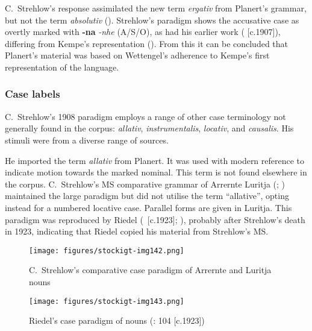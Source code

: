 C.~Strehlow’s response assimilated the new term \textit{ergativ} from Planert’s grammar, but not the term \textit{absolutiv} (). Strehlow’s paradigm shows the accusative case as overtly marked with \textbf{-na} \textit{{}-nhe} (A/S/O), as had his earlier work (\citeyear{strehlow_untitled_1931} [c.1907]), differing from Kempe’s representation (). From this it can be concluded that Planert’s material was based on Wettengel’s adherence to Kempe’s first representation of the language.

\subsubsection{Case labels}
\label{sec:key:9.3.4.1}\label{bkm:Ref74834433}

C.~Strehlow’s 1908 paradigm employs a range of other case terminology not generally found in the corpus: \textit{allativ}, \textit{instrumentalis}, \textit{locativ}, and \textit{causalis}. His stimuli were from a diverse range of sources.

He imported the term \textit{allativ} from Planert. It was used with modern reference to indicate motion towards the marked nominal. This term is not found elsewhere in the corpus. C.~Strehlow’s MS comparative grammar of Arrernte Luritja (\citeyear{strehlow_notitle_1910}; ) maintained the large paradigm but did not utilise the term “allative'', opting instead for a numbered locative case. Parallel forms are given in Luritja. This paradigm was reproduced by Riedel (\citeyear{strehlow_untitled_1931}~[c.1923]; ), probably after Strehlow’s death in 1923, indicating that Riedel copied his material from Strehlow’s \citeyear{strehlow_notitle_1910} MS.


\begin{figure}
\texttt{[image: figures/stockigt-img142.png]}
\caption{C.~Strehlow’s comparative case paradigm of Arrernte and Luritja nouns \citeyearpar[11]{strehlow_notitle_1910}}
\label{bkm:Ref456021579}
\label{fig:key:9-196}
\end{figure}

\begin{figure}
\texttt{[image: figures/stockigt-img143.png]}
\caption{Riedel’s case paradigm of nouns (\citeyear{riedel_notitle_1931}: 104 [c.1923])}
\label{bkm:Ref456021650}
\label{fig:key:9-197}
\end{figure}

